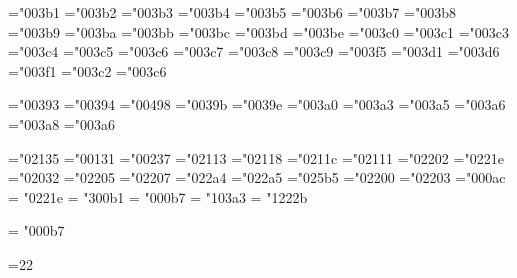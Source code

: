 \mathchardef\alpha="003b1
\mathchardef\beta="003b2
\mathchardef\gamma="003b3
\mathchardef\delta="003b4
\mathchardef\epsilon="003b5
\mathchardef\zeta="003b6
\mathchardef\eta="003b7
\mathchardef\theta="003b8
\mathchardef\iota="003b9
\mathchardef\kappa="003ba
\mathchardef\lambda="003bb
\mathchardef\mu="003bc
\mathchardef\nu="003bd
\mathchardef\xi="003be
\mathchardef\pi="003c0
\mathchardef\rho="003c1
\mathchardef\sigma="003c3
\mathchardef\tau="003c4
\mathchardef\upsilon="003c5
\mathchardef\phi="003c6
\mathchardef\chi="003c7
\mathchardef\psi="003c8
\mathchardef\omega="003c9
\mathchardef\varepsilon="003f5
\mathchardef\vartheta="003d1
\mathchardef\varpi="003d6
\mathchardef\varrho="003f1
\mathchardef\varsigma="003c2
\mathchardef\varphi="003c6

\mathchardef\Gamma="00393
\mathchardef\Delta="00394
\mathchardef\Theta="00498
\mathchardef\Lambda="0039b
\mathchardef\Xi="0039e
\mathchardef\Pi="003a0
\mathchardef\Sigma="003a3
\mathchardef\Upsilon="003a5
\mathchardef\Phi="003a6
\mathchardef\Psi="003a8
\mathchardef\Omega="003a6

\mathchardef\aleph="02135
\mathchardef\imath="00131
\mathchardef\jmath="00237
\mathchardef\ell="02113
\mathchardef\wp="02118
\mathchardef\Re="0211c
\mathchardef\Im="02111
\mathchardef\partial="02202
\mathchardef\infty="0221e
\mathchardef\prime="02032
\mathchardef\emptyset="02205
\mathchardef\nabla="02207
\mathchardef\top="022a4
\mathchardef\bot="022a5
\mathchardef\triangle="025b5
\mathchardef\forall="02200
\mathchardef\exists="02203
\mathchardef\neg="000ac \let\lnot=\neg
\mathchardef\infty = "0221e
\mathchardef\plusminus = "300b1
\mathchardef\cdotp = "000b7
\mathchardef\sum   = "103a3
\mathchardef\intop = "1222b

\def\int{\intop\nolimits}
\def\sqrt{\radical"2221a}
\mathchardef\cdotp = "000b7
\def\cdots{%
  \mathinner{\cdotp\cdotp\cdotp}}

=22
\countdef{}\countdef{}
\def\newcount{\alloc0\count\countdef\inscount}
\def\alloc#1#2#3#4#5{\global\advance\count1#1 by1
  \allocationnumber=\count1#1
  \global#3#5=\allocationnumber}
